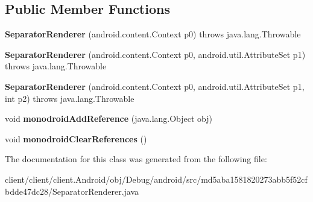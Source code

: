 \subsection*{Public Member Functions}
\begin{DoxyCompactItemize}
\item 
\hypertarget{classmd5aba1581820273abb5f52cfbdde47dc28_1_1SeparatorRenderer_a8bd6a3195199bb0aa5a44242b826ed16}{}{\bfseries Separator\+Renderer} (android.\+content.\+Context p0)  throws java.\+lang.\+Throwable 	\label{classmd5aba1581820273abb5f52cfbdde47dc28_1_1SeparatorRenderer_a8bd6a3195199bb0aa5a44242b826ed16}

\item 
\hypertarget{classmd5aba1581820273abb5f52cfbdde47dc28_1_1SeparatorRenderer_a1d3c721e2881581ee1cd31094a17577c}{}{\bfseries Separator\+Renderer} (android.\+content.\+Context p0, android.\+util.\+Attribute\+Set p1)  throws java.\+lang.\+Throwable 	\label{classmd5aba1581820273abb5f52cfbdde47dc28_1_1SeparatorRenderer_a1d3c721e2881581ee1cd31094a17577c}

\item 
\hypertarget{classmd5aba1581820273abb5f52cfbdde47dc28_1_1SeparatorRenderer_afcd75ef3c1092d0b4501f683cbd001b6}{}{\bfseries Separator\+Renderer} (android.\+content.\+Context p0, android.\+util.\+Attribute\+Set p1, int p2)  throws java.\+lang.\+Throwable 	\label{classmd5aba1581820273abb5f52cfbdde47dc28_1_1SeparatorRenderer_afcd75ef3c1092d0b4501f683cbd001b6}

\item 
\hypertarget{classmd5aba1581820273abb5f52cfbdde47dc28_1_1SeparatorRenderer_a26a5bf436bbe17d9d3a96edc1d306f18}{}void {\bfseries monodroid\+Add\+Reference} (java.\+lang.\+Object obj)\label{classmd5aba1581820273abb5f52cfbdde47dc28_1_1SeparatorRenderer_a26a5bf436bbe17d9d3a96edc1d306f18}

\item 
\hypertarget{classmd5aba1581820273abb5f52cfbdde47dc28_1_1SeparatorRenderer_aec268ede10d125c3c5d85e5c3b222cfa}{}void {\bfseries monodroid\+Clear\+References} ()\label{classmd5aba1581820273abb5f52cfbdde47dc28_1_1SeparatorRenderer_aec268ede10d125c3c5d85e5c3b222cfa}

\end{DoxyCompactItemize}


The documentation for this class was generated from the following file\+:\begin{DoxyCompactItemize}
\item 
client/client/client.\+Android/obj/\+Debug/android/src/md5aba1581820273abb5f52cfbdde47dc28/Separator\+Renderer.\+java\end{DoxyCompactItemize}
